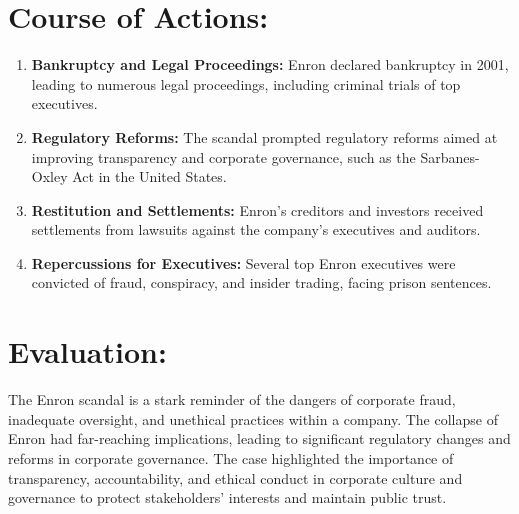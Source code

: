 \documentclass{article}
\begin{document}
\section*{Course of Actions:}
\begin{enumerate}
    \item \textbf{Bankruptcy and Legal Proceedings:} Enron declared bankruptcy in 2001, leading to numerous legal proceedings, including criminal trials of top executives.
    \item \textbf{Regulatory Reforms:} The scandal prompted regulatory reforms aimed at improving transparency and corporate governance, such as the Sarbanes-Oxley Act in the United States.
    \item \textbf{Restitution and Settlements:} Enron's creditors and investors received settlements from lawsuits against the company's executives and auditors.
    \item \textbf{Repercussions for Executives:} Several top Enron executives were convicted of fraud, conspiracy, and insider trading, facing prison sentences.
\end{enumerate}

\section*{Evaluation:}
The Enron scandal is a stark reminder of the dangers of corporate fraud, inadequate oversight, and unethical practices within a company. The collapse of Enron had far-reaching implications, leading to significant regulatory changes and reforms in corporate governance. The case highlighted the importance of transparency, accountability, and ethical conduct in corporate culture and governance to protect stakeholders' interests and maintain public trust.
\end{document}
